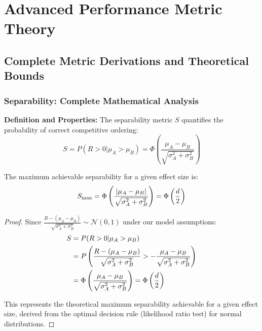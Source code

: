 
\section{Advanced Performance Metric Theory}
\label{app:metrics}

\subsection{Complete Metric Derivations and Theoretical Bounds}

\subsubsection{Separability: Complete Mathematical Analysis}

\textbf{Definition and Properties:}
The separability metric $S$ quantifies the probability of correct competitive ordering:
\begin{equation}
S = P(R > 0 | \mu_A > \mu_B) = \Phi\left(\frac{\mu_A - \mu_B}{\sqrt{\sigma_A^2 + \sigma_B^2}}\right)
\end{equation}

\begin{theorem}
\label{thm:separability_bounds}
The maximum achievable separability for a given effect size is:
\begin{equation}
S_{\max} = \Phi\left(\frac{|\mu_A - \mu_B|}{\sqrt{\sigma_A^2 + \sigma_B^2}}\right) = \Phi\left(\frac{d}{2}\right)
\end{equation}
\end{theorem}

\begin{proof}
Since $\frac{R - (\mu_A - \mu_B)}{\sqrt{\sigma_A^2 + \sigma_B^2}} \sim \mathcal{N}(0,1)$ under our model assumptions:
\begin{align}
S &= P(R > 0 | \mu_A > \mu_B) \\
&= P\left(\frac{R - (\mu_A - \mu_B)}{\sqrt{\sigma_A^2 + \sigma_B^2}} > -\frac{\mu_A - \mu_B}{\sqrt{\sigma_A^2 + \sigma_B^2}}\right) \\
&= \Phi\left(\frac{\mu_A - \mu_B}{\sqrt{\sigma_A^2 + \sigma_B^2}}\right) = \Phi\left(\frac{d}{2}\right)
\end{align}

This represents the theoretical maximum separability achievable for a given effect size, derived from the optimal decision rule (likelihood ratio test) for normal distributions.
\end{proof}

